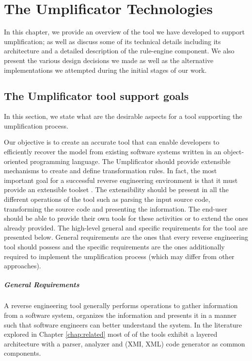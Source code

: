 \lhead{\emph{\leftmark}}  
\chapter{The Umplificator Technologies}
\label{chap:technology}
In this chapter, we provide an overview of the tool we have developed to support umplification; as well as discuss some of its technical details including its architecture and a detailed description of the rule-engine component. We also present the various design decisions we made as well as the alternative implementations we attempted during the initial stages of our work. 

\section{The Umplificator tool support goals}
\label{sec:ch5Goals}
In this section, we state what are the desirable aspects for a tool supporting the umplification process. 

Our objective is to create an accurate tool that can enable developers to efficiently recover the model from existing software systems written in an object-oriented programming language. The Umplificator should provide extensible mechanisms to create and define transformation rules. In fact, the most important goal for a successful reverse engineering environment is that it must provide an extensible toolset \cite{tilley1994programmable}. The extensibility should be present in all the different operations of the tool such as parsing the input source code, transforming the source code and presenting the information. The end-user should be able to provide their own tools for these activities or to extend the ones already provided.  The high-level general and specific requirements for the tool are presented below. General requirements are the ones that every reverse engineering tool should possess and the specific requirements are the ones additionally required to implement the umplification process (which may differ from other approaches).

\paragraph*{General Requirements}
A reverse engineering tool generally performs operations to gather information from a software system, organizes the information and presents it in a manner such that software engineers can better understand the system. In the literature explored in Chapter \ref{chap:related} most of of the tools exhibit a layered architecture with a parser, analyzer and (XMI, XML) code generator as common components.


